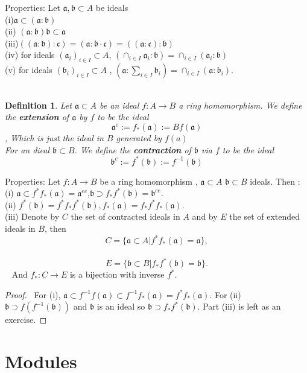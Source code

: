\documentclass[11pt]{article}
\newtheorem{dfn}[thm]{Definition}
\newcommand{\sca}{{\mathfrak a}}
\newcommand{\scb}{{\mathfrak b}}
\newcommand{\scc}{{\mathfrak c}}
\begin{document}
Properties: Let $\sca, \scb\subset A$ be ideals \\
(i)$\sca\subset (\sca:\scb)$\\
(ii) $(\sca:\scb)\scb\subset \sca$\\
(iii)$((\sca:\scb):\scc)=(\sca:\scb\cdot\scc)=((\sca:\scc):\scb)$\\
(iv) for ideals $(\sca_i)_{i\in I}\subset A$, $(\cap_{i\in I}\sca_i:\scb)=\cap_{i\in I}(\sca_i:\scb)$\\
(v) for ideals $(\scb_i)_{i\in I}\subset A$ , $(\sca:\sum_{i\in I }\scb_i)=\cap_{i\in I} (\sca:\scb_i)$.\\
 
\begin{dfn}
Let $\sca\subset A$ be an ideal $f: A\rightarrow  B$ a ring homomorphism. We define the \textbf{extension} of $\sca$ by $f$ to be the ideal 
$$
\sca^e:=f_{*}(\sca):=B f(\sca)
$$,
Which is just the ideal in $B$ generated by $f(a)$\\
For an dieal $\scb\subset B$. We define the \textbf{contraction} of $\scb$ via $f$ to be the ideal 
$$
\scb^c:=f^*(\scb):=f^{-1}(\scb)
$$
\end{dfn}

Properties: Let $f: A\rightarrow B$ be a ring homomorphism , $\sca\subset A$ $\scb\subset B$ ideals. Then :\\
(i) $\sca\subset f^*f_*(\sca)=\sca^{e c}$,$\scb\supset f_{*}f^*(\scb)=\scb^{ce}$.\\
(ii) $f^*(\scb)=f^* f_*f^*(\scb), f_*(\sca)=f_* f^*f_*(\sca)$.\\
(iii) Denote by $C$ the set of contracted ideals in $A$ and by $E$ the set of extended ideals in $B$, then 
$$
C=\{\sca\subset A|f^*f_*(\sca)=\sca\},
$$
 
$$
E=\{\scb\subset B| f_* f^*(\scb)=\scb\}.
$$ 
And $f_*: C\rightarrow E$ is a bijection with inverse $f^*$.
\begin{proof}
 For (i), $\sca\subset f^{-1}f(\sca)\subset f^{-1}f_{*}(\sca)=f^{*}f_*(\sca)$. For (ii) $\scb \supset f(f^{-1}(\scb))$ and $\scb$ is an ideal so $\scb \supset f_{*}f^*(\scb)$. Part (iii) is left as an exercise.
\end{proof}
\section{Modules}
\end{document}
